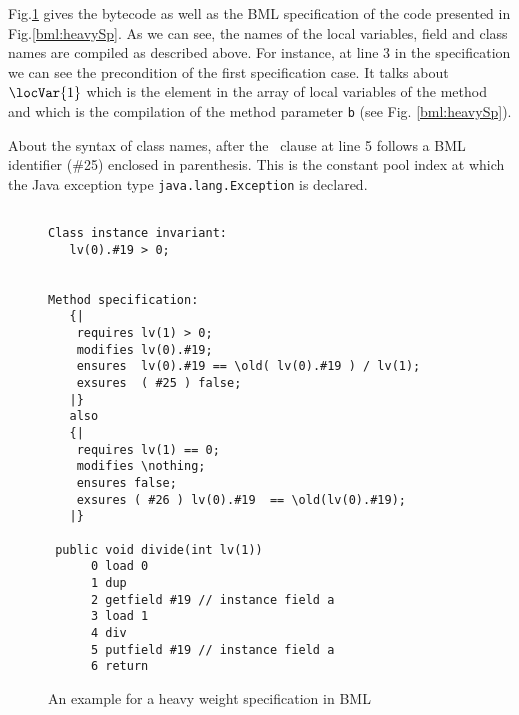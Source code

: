  Fig.\ref{bml:heavySpBML} gives the bytecode as well as the BML specification
 of the code presented in   Fig.\ref{bml:heavySp}. As we can see, the names of the local variables, field and class names  
 are compiled as described above.
 For instance, at line 3 in the specification we can see the precondition of the first specification case.
 It talks about $\locVar{1}$ which is the element in the array of local variables
 of the method  and which is the compilation of  the method parameter \texttt{b} (see Fig. \ref{bml:heavySp}). 

About the syntax of class names,  after the
 \exsures \ clause at line 5 follows a BML identifier (\#25) enclosed in parenthesis.
 This is the constant pool index at which the Java exception  type \texttt{java.lang.Exception} is declared.
 
\begin{figure}[ht!]
\begin{lstlisting}[frame=trbl]

Class instance invariant: 
   lv(0).#19 > 0;
 

Method specification:
   {| 
    requires lv(1) > 0;
    modifies lv(0).#19;
    ensures  lv(0).#19 == \old( lv(0).#19 ) / lv(1);
    exsures  ( #25 ) false;  
   |}
   also 
   {|
    requires lv(1) == 0;
    modifies \nothing;
    ensures false;
    exsures ( #26 ) lv(0).#19  == \old(lv(0).#19);
   |}

 public void divide(int lv(1)) 
      0 load 0
      1 dup
      2 getfield #19 // instance field a
      3 load 1
      4 div
      5 putfield #19 // instance field a
      6 return
\end{lstlisting}
\caption{\sc An example for a heavy weight specification in BML} \label{bml:heavySpBML}
\end{figure}

